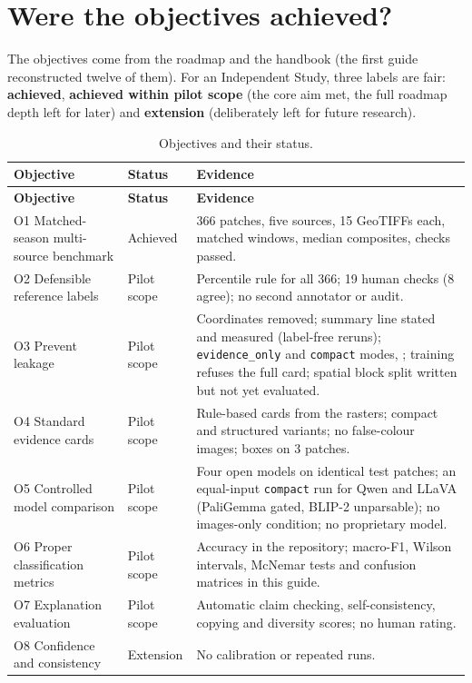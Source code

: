 \section{Were the objectives achieved?}

The objectives come from the roadmap and the handbook (the first guide reconstructed twelve of them). For an Independent Study, three labels are fair: \textbf{achieved}, \textbf{achieved within pilot scope} (the core aim met, the full roadmap depth left for later) and \textbf{extension} (deliberately left for future research).

\begin{longtable}{L{4.2cm}L{2.0cm}L{8.0cm}}
\caption{Objectives and their status.}\label{tab:objectives}\\
\toprule
\textbf{Objective} & \textbf{Status} & \textbf{Evidence} \\
\midrule
\endfirsthead
\toprule
\textbf{Objective} & \textbf{Status} & \textbf{Evidence} \\
\midrule
\endhead
O1 Matched-season multi-source benchmark & Achieved & 366 patches, five sources, 15 GeoTIFFs each, matched windows, median composites, checks passed. \\
O2 Defensible reference labels & Pilot scope & Percentile rule for all 366; 19 human checks (8 agree); no second annotator or audit. \\
O3 Prevent leakage & Pilot scope & Coordinates removed; summary line stated and measured (label-free reruns); \texttt{evidence\_only} and \texttt{compact} modes, ; training refuses the full card; spatial block split written but not yet evaluated. \\
O4 Standard evidence cards & Pilot scope & Rule-based cards from the rasters; compact and structured variants; no false-colour images; boxes on 3 patches. \\
O5 Controlled model comparison & Pilot scope & Four open models on identical test patches; an equal-input \texttt{compact} run for Qwen and LLaVA (PaliGemma gated, BLIP-2 unparsable); no images-only condition; no proprietary model. \\
O6 Proper classification metrics & Pilot scope & Accuracy in the repository; macro-F1, Wilson intervals, McNemar tests and confusion matrices in this guide. \\
O7 Explanation evaluation & Pilot scope & Automatic claim checking, self-consistency, copying and diversity scores; no human rating. \\
O8 Confidence and consistency & Extension & No calibration or repeated runs. \\

\end{longtable}

